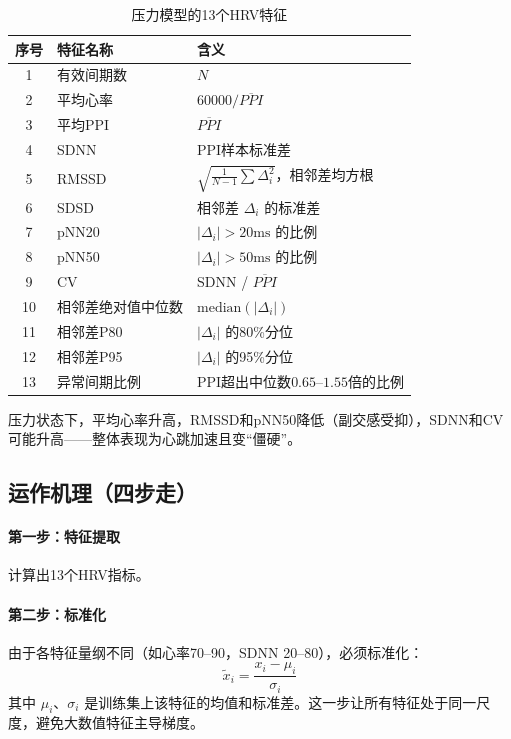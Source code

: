 \documentclass[UTF8]{ctexart}
\begin{document}
\begin{table}[ht]
\centering
\small
\begin{tabular}{@{}cll@{}}
\toprule
序号 & 特征名称 & 含义 \\
\midrule
1 & 有效间期数 & $N$ \\
2 & 平均心率 & $60000 / \overline{PPI}$ \\
3 & 平均PPI & $\overline{PPI}$ \\
4 & SDNN & PPI样本标准差 \\
5 & RMSSD & $\sqrt{\frac{1}{N-1}\sum \Delta_i^2}$，相邻差均方根 \\
6 & SDSD & 相邻差 $\Delta_i$ 的标准差 \\
7 & pNN20 & $|\Delta_i| > 20\text{ms}$ 的比例 \\
8 & pNN50 & $|\Delta_i| > 50\text{ms}$ 的比例 \\
9 & CV & SDNN / $\overline{PPI}$ \\
10 & 相邻差绝对值中位数 & $\text{median}(|\Delta_i|)$ \\
11 & 相邻差P80 & $|\Delta_i|$ 的80\%分位 \\
12 & 相邻差P95 & $|\Delta_i|$ 的95\%分位 \\
13 & 异常间期比例 & PPI超出中位数$0.65$--$1.55$倍的比例 \\
\bottomrule
\end{tabular}
\caption{压力模型的13个HRV特征}
\end{table}

压力状态下，平均心率升高，RMSSD和pNN50降低（副交感受抑），SDNN和CV可能升高——整体表现为心跳加速且变“僵硬”。

\subsection{运作机理（四步走）}

\paragraph{第一步：特征提取} 计算出13个HRV指标。

\paragraph{第二步：标准化} 由于各特征量纲不同（如心率70--90，SDNN 20--80），必须标准化：
\begin{equation}
\tilde{x}_i = \frac{x_i - \mu_i}{\sigma_i}
\end{equation}
其中 $\mu_i$、$\sigma_i$ 是训练集上该特征的均值和标准差。这一步让所有特征处于同一尺度，避免大数值特征主导梯度。
\end{document}
